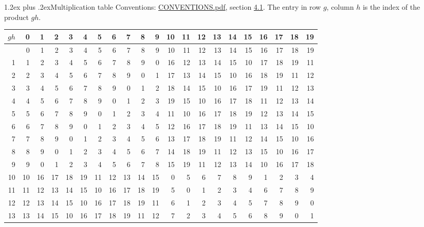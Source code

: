 \documentclass[10pt,a4paper]{article}
\makeatletter
\renewcommand\section{\@startsection{section}{1}{\z@}{-3ex plus -1ex minus -.2ex}%
  {1.2ex plus .2ex}{\normalfont\large\sffamily\bfseries\color{parttitle}}}
\numberwithin{equation}{section}
\makeatother
\begin{document}
\section{Multiplication table}\label{s:multiplication}
Conventions: \href{../../CONVENTIONS.pdf}{CONVENTIONS.pdf}, section \href{../../CONVENTIONS.pdf\#conv.4.1}{4.1}.
The entry in row $g$, column $h$ is the index of the product $gh$.
{\normalsize\setlength{\tabcolsep}{0.1em}\setlength{\LTleft}{-8pt plus 1fill}\setlength{\LTright}{-8pt plus 1fill}\begin{longtable}{@{}r|rrrrrrrrrrrrrrrrrrrr@{}}\toprule
$gh$ & 0 & 1 & 2 & 3 & 4 & 5 & 6 & 7 & 8 & 9 & 10 & 11 & 12 & 13 & 14 & 15 & 16 & 17 & 18 & 19\\\midrule\endhead
\bottomrule\endfoot\endlastfoot
0 & 0 & 1 & 2 & 3 & 4 & 5 & 6 & 7 & 8 & 9 & 10 & 11 & 12 & 13 & 14 & 15 & 16 & 17 & 18 & 19\\*
1 & 1 & 2 & 3 & 4 & 5 & 6 & 7 & 8 & 9 & 0 & 16 & 12 & 13 & 14 & 15 & 10 & 17 & 18 & 19 & 11\\
2 & 2 & 3 & 4 & 5 & 6 & 7 & 8 & 9 & 0 & 1 & 17 & 13 & 14 & 15 & 10 & 16 & 18 & 19 & 11 & 12\\
3 & 3 & 4 & 5 & 6 & 7 & 8 & 9 & 0 & 1 & 2 & 18 & 14 & 15 & 10 & 16 & 17 & 19 & 11 & 12 & 13\\
4 & 4 & 5 & 6 & 7 & 8 & 9 & 0 & 1 & 2 & 3 & 19 & 15 & 10 & 16 & 17 & 18 & 11 & 12 & 13 & 14\\
5 & 5 & 6 & 7 & 8 & 9 & 0 & 1 & 2 & 3 & 4 & 11 & 10 & 16 & 17 & 18 & 19 & 12 & 13 & 14 & 15\\
6 & 6 & 7 & 8 & 9 & 0 & 1 & 2 & 3 & 4 & 5 & 12 & 16 & 17 & 18 & 19 & 11 & 13 & 14 & 15 & 10\\
7 & 7 & 8 & 9 & 0 & 1 & 2 & 3 & 4 & 5 & 6 & 13 & 17 & 18 & 19 & 11 & 12 & 14 & 15 & 10 & 16\\
8 & 8 & 9 & 0 & 1 & 2 & 3 & 4 & 5 & 6 & 7 & 14 & 18 & 19 & 11 & 12 & 13 & 15 & 10 & 16 & 17\\
9 & 9 & 0 & 1 & 2 & 3 & 4 & 5 & 6 & 7 & 8 & 15 & 19 & 11 & 12 & 13 & 14 & 10 & 16 & 17 & 18\\
10 & 10 & 16 & 17 & 18 & 19 & 11 & 12 & 13 & 14 & 15 & 0 & 5 & 6 & 7 & 8 & 9 & 1 & 2 & 3 & 4\\
11 & 11 & 12 & 13 & 14 & 15 & 10 & 16 & 17 & 18 & 19 & 5 & 0 & 1 & 2 & 3 & 4 & 6 & 7 & 8 & 9\\
12 & 12 & 13 & 14 & 15 & 10 & 16 & 17 & 18 & 19 & 11 & 6 & 1 & 2 & 3 & 4 & 5 & 7 & 8 & 9 & 0\\
13 & 13 & 14 & 15 & 10 & 16 & 17 & 18 & 19 & 11 & 12 & 7 & 2 & 3 & 4 & 5 & 6 & 8 & 9 & 0 & 1\\

\end{longtable}}
\end{document}
